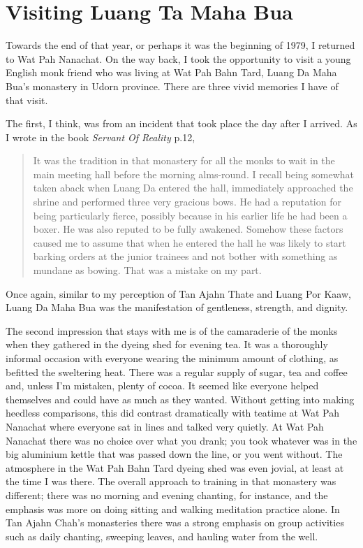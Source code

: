 \chapter{Visiting Luang Ta Maha Bua}

Towards the end of that year, or perhaps it was the beginning of 1979, I
returned to Wat Pah Nanachat. On the way back, I took the opportunity to
visit a young English monk friend who was living at Wat Pah Bahn Tard,
Luang Da Maha Bua's monastery in Udorn province. There are three vivid
memories I have of that visit.

The first, I think, was from an incident that took place the day after I
arrived. As I wrote in the book \emph{Servant Of Reality}\cite{servant} p.12,

\begin{quotation}
It was the tradition in that monastery for all the monks to wait in the
main meeting hall before the morning alms-round. I recall being somewhat
taken aback when Luang Da entered the hall, immediately approached the
shrine and performed three very gracious bows. He had a reputation for
being particularly fierce, possibly because in his earlier life he had
been a boxer. He was also reputed to be fully awakened. Somehow these
factors caused me to assume that when he entered the hall he was likely
to start barking orders at the junior trainees and not bother with
something as mundane as bowing. That was a mistake on my part.
\end{quotation}

Once again, similar to my perception of Tan Ajahn Thate and Luang Por
Kaaw, Luang Da Maha Bua was the manifestation of gentleness, strength,
and dignity.

The second impression that stays with me is of the camaraderie of the
monks when they gathered in the dyeing shed for evening tea. It was a
thoroughly informal occasion with everyone wearing the minimum amount of
clothing, as befitted the sweltering heat. There was a regular supply of
sugar, tea and coffee and, unless I'm mistaken, plenty of cocoa. It
seemed like everyone helped themselves and could have as much as they
wanted. Without getting into making heedless comparisons, this did
contrast dramatically with teatime at Wat Pah Nanachat where everyone
sat in lines and talked very quietly. At Wat Pah Nanachat there was no
choice over what you drank; you took whatever was in the big aluminium
kettle that was passed down the line, or you went without. The
atmosphere in the Wat Pah Bahn Tard dyeing shed was even jovial, at
least at the time I was there. The overall approach to training in that
monastery was different; there was no morning and evening chanting, for
instance, and the emphasis was more on doing sitting and walking
meditation practice alone. In Tan Ajahn Chah's monasteries there was a
strong emphasis on group activities such as daily chanting, sweeping
leaves, and hauling water from the well.

